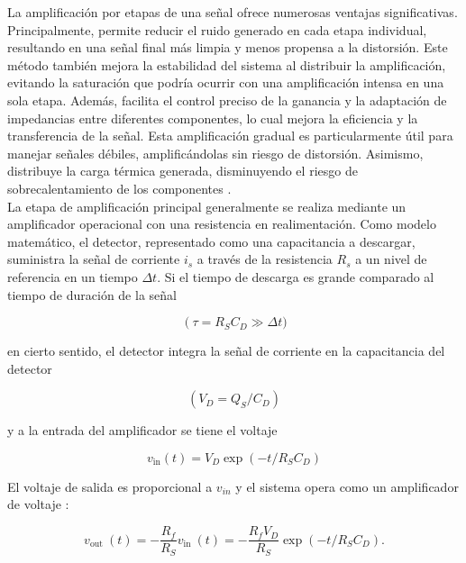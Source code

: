 \documentclass[]{book}
\begin{document}
\noindent La amplificación por etapas de una señal ofrece numerosas ventajas significativas. Principalmente, permite reducir el ruido generado en cada etapa individual, resultando en una señal final más limpia y menos propensa a la distorsión. Este método también mejora la estabilidad del sistema al distribuir la amplificación, evitando la saturación que podría ocurrir con una amplificación intensa en una sola etapa. Además, facilita el control preciso de la ganancia y la adaptación de impedancias entre diferentes componentes, lo cual mejora la eficiencia y la transferencia de la señal. Esta amplificación gradual es particularmente útil para manejar señales débiles, amplificándolas sin riesgo de distorsión. Asimismo, distribuye la carga térmica generada, disminuyendo el riesgo de sobrecalentamiento de los componentes \cite{webster2018measurement}. \\

\noindent La etapa de amplificación principal generalmente se realiza mediante un amplificador operacional con una resistencia en realimentación. Como modelo matemático, el detector, representado como una capacitancia a descargar, suministra la señal de corriente $i_{s}$ a través de la resistencia $R_{s}$ a un nivel de referencia en un tiempo $\Delta t$. Si el tiempo de descarga es grande comparado al tiempo de duración de la señal 

\begin{equation}
    \left(\tau=R_S C_D \gg\right. \Delta t)
\end{equation}

en cierto sentido, el detector integra la señal de corriente en la capacitancia del detector 

\begin{equation}
    \left(V_D=Q_S / C_D\right) 
\end{equation}

y a la entrada del amplificador se tiene el voltaje 

\begin{equation}
    v_{\text{in}}(t)=V_D \exp \left(-t / R_S C_D\right)
\end{equation}

\noindent El voltaje de salida es proporcional a $v_{i n}$ y el sistema opera como un amplificador de voltaje \cite{kolanoski2020particle}:


\begin{equation}
    v_{\text {out }}(t)=-\frac{R_f}{R_S} v_{\text {in }}(t)=-\frac{R_f V_D}{R_S} \exp \left(-t / R_S C_D\right) .
\end{equation}
\end{document}
